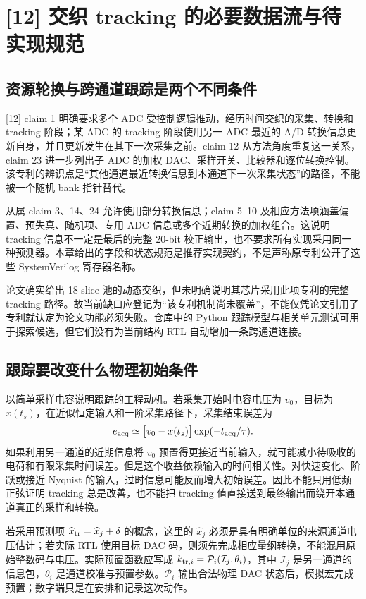 \section{[12] 交织 tracking 的必要数据流与待实现规范}
\subsection{资源轮换与跨通道跟踪是两个不同条件}
[12] claim 1 明确要求多个 ADC 受控制逻辑推动，经历时间交织的采集、转换和 tracking 阶段；某 ADC 的 tracking 阶段使用另一 ADC 最近的 A/D 转换信息更新自身，并且更新发生在其下一次采集之前。claim 12 从方法角度重复这一关系，claim 23 进一步列出子 ADC 的加权 DAC、采样开关、比较器和逐位转换控制。该专利的辨识点是“其他通道最近转换信息到本通道下一次采集状态”的路径，不能被一个随机 bank 指针替代。

从属 claim 3、14、24 允许使用部分转换信息；claim 5--10 及相应方法项涵盖偏置、预失真、随机项、专用 ADC 信息或多个近期转换的加权组合。这说明 tracking 信息不一定是最后的完整 20-bit 校正输出，也不要求所有实现采用同一种预测器。本章给出的字段和状态规范是推荐实现契约，不是声称原专利公开了这些 SystemVerilog 寄存器名称。

论文确实给出 18 slice 池的动态交织，但未明确说明其芯片采用此项专利的完整 tracking 路径。故当前缺口应登记为“该专利机制尚未覆盖”，不能仅凭论文引用了专利就认定为论文功能必须失败。仓库中的 Python 跟踪模型与相关单元测试可用于探索候选，但它们没有为当前结构 RTL 自动增加一条跨通道连接。

\subsection{跟踪要改变什么物理初始条件}
以简单采样电容说明跟踪的工程动机。若采集开始时电容电压为 \(v_0\)，目标为 \(x(t_s)\)，在近似恒定输入和一阶采集路径下，采集结束误差为
\begin{equation}
e_{\rm acq}\simeq\bigl[v_0-x(t_s)\bigr]\exp(-t_{\rm acq}/\tau).
\end{equation}
如果利用另一通道的近期信息将 \(v_0\) 预置得更接近当前输入，就可能减小待吸收的电荷和有限采集时间误差。但是这个收益依赖输入的时间相关性。对快速变化、阶跃或接近 Nyquist 的输入，过时信息可能反而增大初始误差。因此不能只用低频正弦证明 tracking 总是改善，也不能把 tracking 值直接送到最终输出而绕开本通道真正的采样和转换。

若采用预测项 \(\widehat x_{\rm tr}=\widehat x_j+\delta\) 的概念，这里的 \(\widehat x_j\) 必须是具有明确单位的来源通道电压估计；若实际 RTL 使用目标 DAC 码，则须先完成相应量纲转换，不能混用原始整数码与电压。实际预置函数应写成 \(k_{{\rm tr},i}=\mathcal P_i(\mathcal I_j,\theta_i)\)，其中 \(\mathcal I_j\) 是另一通道的信息包，\(\theta_i\) 是通道校准与预置参数。\(\mathcal P_i\) 输出合法物理 DAC 状态后，模拟宏完成预置；数字端只是在安排和记录这次动作。

